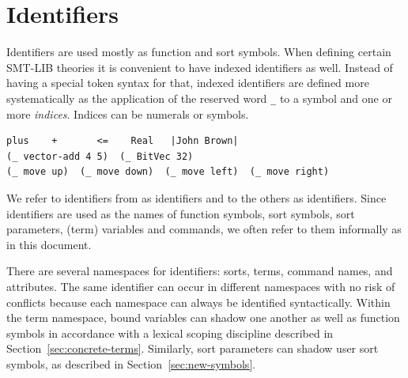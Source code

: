 \section{Identifiers} \label{sec:identifiers}

Identifiers are used mostly as function and sort symbols.
When defining certain SMT-LIB theories 
it is convenient to have indexed identifiers as well.
Instead of having a special token syntax for that,
indexed identifiers are defined more systematically 
as the application of the reserved word \verb+_+
to a symbol and one or more \emph{indices}.
Indices can be numerals or symbols.
\bigskip

\cIdentifiers
\bigskip

\begin{lstlisting}[linewidth=38em]
plus    +       <=    Real   |John Brown|
(_ vector-add 4 5)  (_ BitVec 32)
(_ move up)  (_ move down)  (_ move left)  (_ move right)
\end{lstlisting}

We refer to identifiers from  as  identifiers
and to the others as  identifiers.
Since identifiers are used as the names of function symbols, sort symbols,
sort parameters, (term) variables and commands, 
we often refer to them informally as  in this document.
  
\begin{remark}
There are several namespaces for identifiers:
sorts, terms, command names, and attributes. 
The same identifier can occur in different namespaces with no risk of conflicts
because each namespace can always be identified syntactically.
Within the term namespace, bound variables can shadow one another as well as
function symbols in accordance with a lexical scoping discipline described 
in Section~\ref{sec:concrete-terms}. 
Similarly, sort parameters can shadow user sort symbols,
as described in Section~\ref{sec:new-symbols}.
\end{remark}


